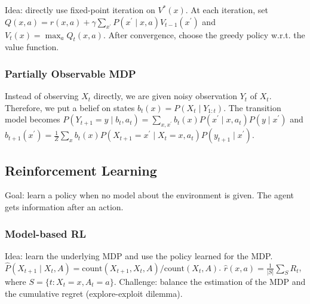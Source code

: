 Idea: directly use fixed-point iteration on $V^*(x)$. At each iteration, set $Q(x,a)=r(x,a)+\gamma \sum_{x^\prime} P(x^\prime\mid x, a) V_{t-1}(x^\prime)$ and $V_t(x)=\max_a Q_t(x,a)$. After convergence, choose the greedy policy w.r.t. the value function.

\subsubsection*{Partially Observable MDP}

Instead of observing $X_t$ directly, we are given noisy observation $Y_t$ of $X_t$. Therefore, we put a belief on states $b_t(x)=P(X_t\mid Y_{1:t})$. The transition model becomes $P\left(Y_{t+1}=y \mid b_{t}, a_{t}\right)=\sum_{x, x^{\prime}} b_{t}(x) P\left(x^{\prime} \mid x, a_{t}\right) P\left(y \mid x^{\prime}\right)$ and $b_{t+1}\left(x^{\prime}\right)=\frac{1}{Z} \sum_{x} b_{t}(x) P\left(X_{t+1}=x^{\prime} \mid X_{t}=x, a_{t}\right) P\left(y_{t+1} \mid x^{\prime}\right)$.

\subsection{Reinforcement Learning}

Goal: learn a policy when no model about the environment is given. The agent gets information after an action.

\subsubsection*{Model-based RL}

Idea: learn the underlying MDP and use the policy learned for the MDP.
$\hat{P}(X_{t+1}\mid X_t, A) = \text{count}(X_{t+1}, X_t, A) / \text{count}(X_t,A)$. $\hat{r}(x,a) = \frac{1}{|S|} \sum_S R_t$, where $S=\{t: X_t=x, A_t=a\}$. Challenge: balance the estimation of the MDP and the cumulative regret (explore-exploit dilemma).


